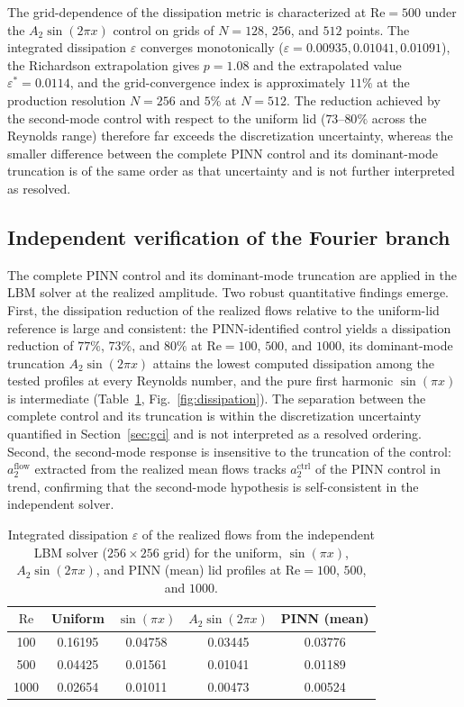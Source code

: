 \documentclass[aip,pof,reprint,superscriptaddress]{revtex4-2}
\newcommand{\re}{\mathrm{Re}}
\begin{document}
The grid-dependence of the dissipation metric is characterized at $\re=500$ under the $A_2\sin(2\pi x)$ control on grids of $N=128$, $256$, and $512$ points. The integrated dissipation $\varepsilon$ converges monotonically ($\varepsilon=0.00935,0.01041,0.01091$), the Richardson extrapolation gives $p=1.08$ and the extrapolated value $\varepsilon^*=0.0114$, and the grid-convergence index is approximately $11\%$ at the production resolution $N=256$ and $5\%$ at $N=512$. The reduction achieved by the second-mode control with respect to the uniform lid ($73$--$80\%$ across the Reynolds range) therefore far exceeds the discretization uncertainty, whereas the smaller difference between the complete PINN control and its dominant-mode truncation is of the same order as that uncertainty and is not further interpreted as resolved.

\subsection{Independent verification of the Fourier branch}\label{sec:dissipation}

The complete PINN control and its dominant-mode truncation are applied in the LBM solver at the realized amplitude. Two robust quantitative findings emerge. First, the dissipation reduction of the realized flows relative to the uniform-lid reference is large and consistent: the PINN-identified control yields a dissipation reduction of $77\%$, $73\%$, and $80\%$ at $\re=100$, $500$, and $1000$, its dominant-mode truncation $A_2\sin(2\pi x)$ attains the lowest computed dissipation among the tested profiles at every Reynolds number, and the pure first harmonic $\sin(\pi x)$ is intermediate (Table~\ref{tab:dissipation}, Fig.~\ref{fig:dissipation}). The separation between the complete control and its truncation is within the discretization uncertainty quantified in Section~\ref{sec:gci} and is not interpreted as a resolved ordering. Second, the second-mode response is insensitive to the truncation of the control: $a_2^{\mathrm{flow}}$ extracted from the realized mean flows tracks $a_2^{\mathrm{ctrl}}$ of the PINN control in trend, confirming that the second-mode hypothesis is self-consistent in the independent solver.

\begin{table}[t]
\caption{\label{tab:dissipation} Integrated dissipation $\varepsilon$ of the realized flows from the independent LBM solver ($256\times256$ grid) for the uniform, $\sin(\pi x)$, $A_2\sin(2\pi x)$, and PINN (mean) lid profiles at $\re=100$, $500$, and $1000$.}
\centering
\begin{tabular}{ccccc}
\toprule
$\re$ & Uniform & $\sin(\pi x)$ & $A_2\sin(2\pi x)$ & PINN (mean) \\
\midrule
100  & 0.16195 & 0.04758 & 0.03445 & 0.03776 \\
500  & 0.04425 & 0.01561 & 0.01041 & 0.01189 \\
1000 & 0.02654 & 0.01011 & 0.00473 & 0.00524 \\
\bottomrule
\end{tabular}
\end{table}
\end{document}
